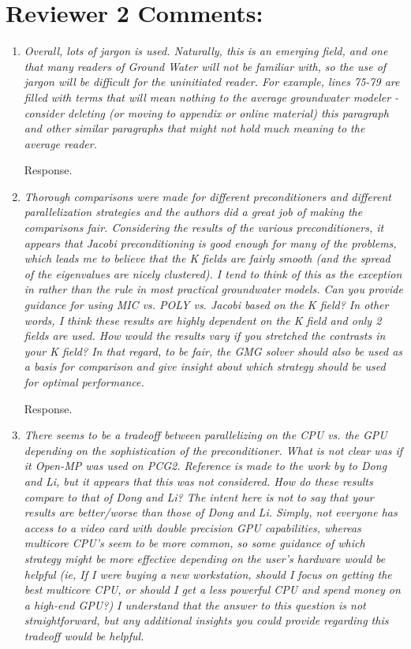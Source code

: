 \documentclass[12pt]{article} %
\begin{document}
\section*{Reviewer 2 Comments:}
\begin{enumerate}
\item \textit{Overall, lots of jargon is used. Naturally, this is an emerging field, and one that many readers of Ground Water will not be familiar with, so the use of jargon will be difficult for the uninitiated reader. For example, lines 75-79 are filled with terms that will mean nothing to the average groundwater modeler - consider deleting (or moving to appendix or online material) this paragraph and other similar paragraphs that might not hold much meaning to the average reader.} 

Response.

\item \textit{Thorough comparisons were made for different preconditioners and different parallelization strategies and the authors did a great job of making the comparisons fair. Considering the results of the various preconditioners, it appears that Jacobi preconditioning is good enough for many of the problems, which leads me to believe that the K fields are fairly smooth (and the spread of the eigenvalues are nicely clustered). I tend to think of this as the exception in rather than the rule in most practical groundwater models. Can you provide guidance for using MIC vs. POLY vs. Jacobi based on the K field? In other words, I think these results are highly dependent on the K field and only 2 fields are used. How would the results vary if you stretched the contrasts in your K field? In that regard, to be fair, the GMG solver should also be used as a basis for comparison and give insight about which strategy should be used for optimal performance.} 

Response. 

\item \textit{There seems to be a tradeoff between parallelizing on the CPU vs. the GPU depending on the sophistication of the preconditioner. What is not clear was if it Open-MP was used on PCG2. Reference is made to the work by to Dong and Li, but it appears that this was not considered. How do these results compare to that of Dong and Li? The intent here is not to say that your results are better/worse than those of Dong and Li. Simply, not everyone has access to a video card with double precision GPU capabilities, whereas multicore CPU's seem to be more common, so some guidance of which strategy might be more effective depending on the user's hardware would be helpful (ie, If I were buying a new workstation, should I focus on getting the best multicore CPU, or should I get a less powerful CPU and spend money on a high-end GPU?) I understand that the answer to this question is not straightforward, but any additional insights you could provide regarding this tradeoff would be helpful.} 


\end{enumerate}
\end{document}
